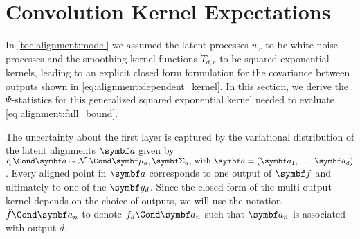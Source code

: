 \section{Convolution Kernel Expectations}
\label{toc:alignment:kernel_expectations}
In \cref{toc:alignment:model} we assumed the latent processes $w_r$ to be white noise processes and the smoothing kernel functions $T_{d, r}$ to be squared exponential kernels, leading to an explicit closed form formulation for the covariance between outputs shown in \cref{eq:alignment:dependent_kernel}.
In this section, we derive the $\Psi$-statistics for this generalized squared exponential kernel needed to evaluate \cref{eq:alignment:full_bound}.

The uncertainty about the first layer is captured by the variational distribution of the latent alignments $\rv{a}$ given by $\Variat{\rv{a}} \sim \Gaussian{\mat{\mu_a}, \mat{\Sigma_a}}\text{, with } \rv{a} = \left( \rv{a_1}, \dots, \rv{a_d} \right)$.
Every aligned point in $\rv{a}$ corresponds to one output of $\rv{f}$ and ultimately to one of the $\rv{y_d}$.
Since the closed form of the multi output kernel depends on the choice of outputs, we will use the notation $\Fun{\hat{f}}{\rv{a_n}}$ to denote $\Fun{f_d}{\rv{a_n}}$ such that $\rv{a_n}$ is associated with output $d$.

